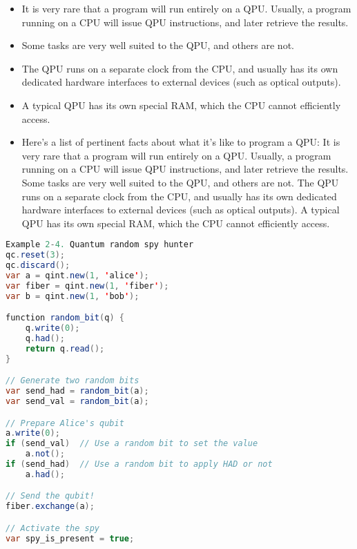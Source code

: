 

\begin{mdframed}[style=important, frametitle={QPU Versus GPU: Some Common Characteristics}]

\begin{itemize}
\item It is very rare that a program will run entirely on a QPU. Usually, a program running on a CPU will issue QPU instructions, and later retrieve the results.
\item Some tasks are very well suited to the QPU, and others are not.
\item The QPU runs on a separate clock from the CPU, and usually has its own dedicated hardware interfaces to external devices (such as optical outputs).
\item A typical QPU has its own special RAM, which the CPU cannot efficiently access.
\item Here's a list of pertinent facts about what it’s like to program a QPU:
It is very rare that a program will run entirely on a QPU. Usually, a program running on a CPU will issue QPU instructions, and later retrieve the results.
Some tasks are very well suited to the QPU, and others are not.
The QPU runs on a separate clock from the CPU, and usually has its own dedicated hardware interfaces to external devices (such as optical outputs).
A typical QPU has its own special RAM, which the CPU cannot efficiently access.
\end{itemize}
\end{mdframed}

\begin{lstlisting}[language=java, caption=Javascript Program: Quantum random spy hunter]
Example 2-4. Quantum random spy hunter
qc.reset(3);
qc.discard();
var a = qint.new(1, 'alice');
var fiber = qint.new(1, 'fiber');
var b = qint.new(1, 'bob');

function random_bit(q) {
    q.write(0);
    q.had();
    return q.read();
}

// Generate two random bits
var send_had = random_bit(a);
var send_val = random_bit(a);

// Prepare Alice's qubit
a.write(0);
if (send_val)  // Use a random bit to set the value
    a.not();
if (send_had)  // Use a random bit to apply HAD or not
    a.had();

// Send the qubit!
fiber.exchange(a);

// Activate the spy
var spy_is_present = true;
\end{lstlisting}